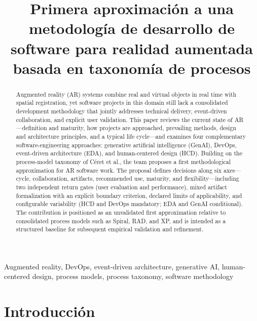 \documentclass[conference]{IEEEtran}
\begin{document}
\title{Primera aproximación a una metodología de desarrollo de software para realidad aumentada basada en taxonomía de procesos}
\author{
}
\maketitle

\begin{abstract}
Augmented reality (AR) systems combine real and virtual objects in real time with spatial registration, yet software projects in this domain still lack a consolidated development methodology that jointly addresses technical delivery, event-driven collaboration, and explicit user validation. This paper reviews the current state of AR---definition and maturity, how projects are approached, prevailing methods, design and architecture principles, and a typical life cycle---and examines four complementary software-engineering approaches: generative artificial intelligence (GenAI), DevOps, event-driven architecture (EDA), and human-centered design (HCD). Building on the process-model taxonomy of Céret et al., the team proposes a first methodological approximation for AR software work. The proposal defines decisions along six axes---cycle, collaboration, artifacts, recommended use, maturity, and flexibility---including two independent return gates (user evaluation and performance), mixed artifact formalization with an explicit boundary criterion, declared limits of applicability, and configurable variability (HCD and DevOps mandatory; EDA and GenAI conditional). The contribution is positioned as an unvalidated first approximation relative to consolidated process models such as Spiral, RAD, and XP, and is intended as a structured baseline for subsequent empirical validation and refinement.\\
\end{abstract}

\begin{IEEEkeywords}
Augmented reality, DevOps, event-driven architecture, generative AI, human-centered design, process models, process taxonomy, software methodology
\end{IEEEkeywords}

\section{Introducción}
\end{document}
